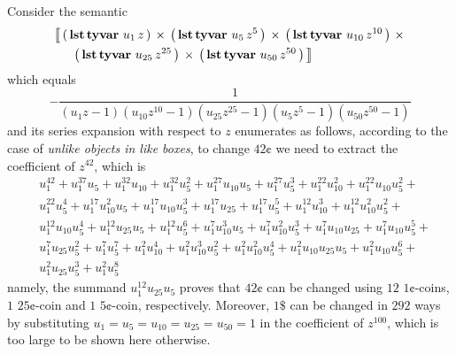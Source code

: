 \begin{example}
Consider the semantic
\begin{displaymath}
\begin{split}
&\semantic{\tycp{\typarens{\tylst{\tyvar{u_{1}\,z}}}}{
            \tycp{\typarens{\tylst{\tyvar{u_{5}\,z^{5}}}}}{
            \tycp{\typarens{\tylst{\tyvar{u_{10}\,z^{10}}}}}{\right.\\
            &\indent\left.\tycp{\typarens{\tylst{\tyvar{u_{25}\,z^{25}}}}}
                  {\typarens{\tylst{\tyvar{u_{50}\,z^{50}}}}}}}}} \\
\end{split}
\end{displaymath}
which equals
\begin{displaymath}
- \frac{1}{\left(u_{1} z - 1\right) \left(u_{10} z^{10} - 1\right) \left(u_{25} z^{25} - 1\right) \left(u_{5} z^{5} - 1\right) \left(u_{50} z^{50} - 1\right)}
\end{displaymath}
and its series expansion with respect to $z$ enumerates as follows,
according to the case of \textit{unlike objects in like boxes}, to change $42¢$
we need to extract the coefficient of $z^{42}$, which is
\begin{displaymath}
\begin{split}
&u_{1}^{42} + u_{1}^{37} u_{5} + u_{1}^{32} u_{10} + u_{1}^{32} u_{5}^{2} + u_{1}^{27} u_{10} u_{5} + u_{1}^{27} u_{5}^{3} + u_{1}^{22} u_{10}^{2} + u_{1}^{22} u_{10} u_{5}^{2} + \\
&u_{1}^{22} u_{5}^{4} + u_{1}^{17} u_{10}^{2} u_{5} + u_{1}^{17} u_{10} u_{5}^{3} + u_{1}^{17} u_{25} + u_{1}^{17} u_{5}^{5} + u_{1}^{12} u_{10}^{3} + u_{1}^{12} u_{10}^{2} u_{5}^{2} + \\
&u_{1}^{12} u_{10} u_{5}^{4} + u_{1}^{12} u_{25} u_{5} + u_{1}^{12} u_{5}^{6} + u_{1}^{7} u_{10}^{3} u_{5} + u_{1}^{7} u_{10}^{2} u_{5}^{3} + u_{1}^{7} u_{10} u_{25} + u_{1}^{7} u_{10} u_{5}^{5} + \\
&u_{1}^{7} u_{25} u_{5}^{2} + u_{1}^{7} u_{5}^{7} + u_{1}^{2} u_{10}^{4} + u_{1}^{2} u_{10}^{3} u_{5}^{2} + u_{1}^{2} u_{10}^{2} u_{5}^{4} + u_{1}^{2} u_{10} u_{25} u_{5} + u_{1}^{2} u_{10} u_{5}^{6} + \\
&u_{1}^{2} u_{25} u_{5}^{3} + u_{1}^{2} u_{5}^{8}
\end{split}
\end{displaymath}
namely, the summand $u_{1}^{12} u_{25} u_{5}$ proves that $42¢$ can be changed
using $12$ $1¢$-coins, $1$ $25¢$-coin and $1$ $5¢$-coin, respectively.
Moreover, $1\$$ can be changed in $292$ ways by substituting $u_{1} = u_{5} =
u_{10} = u_{25} = u_{50} = 1$ in the coefficient of $z^{100}$, which is too
large to be shown here otherwise.
\end{example}


